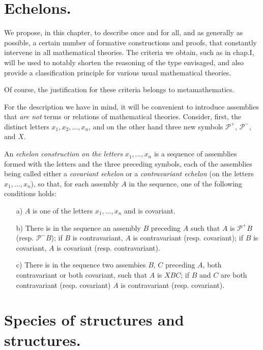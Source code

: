 \documentclass{article}
\newcommand{\Pp}{\mathcal{P}^+}
\newcommand{\Pm}{\mathcal{P}^-}
\begin{document}
\section*{Echelons.}

We propose, in this chapter, to describe once and for all, and as
generally as possible, a certain number of formative constructions and
proofs, that constantly intervene in all mathematical theories.  The
criteria we obtain, such as in chap.I, will be used to notably shorten
the reasoning of the type envisaged, and also provide a classification
principle for various usual mathematical theories.

Of course, the justification for these criteria belongs to
metamathematics.

For the description we have in mind, it will be convenient to
introduce assemblies that \emph{are not} terms or relations of
mathematical theories.  Consider, first, the distinct letters $x_1,
x_2, \dots, x_n$, and on the other hand three new symbols $\Pp$, $\Pm$,
and $X$.

An \emph{echelon construction on the letters} $x_1, \dots, x_n$ is a
sequence of assemblies formed with the letters and the three preceding
symbols, each of the assemblies being called either a \emph{covariant
  echelon} or a \emph{contravariant echelon} (on the letters $x_1,
\dots, x_n$), so that, for each assembly $A$ in the sequence, one of
the following conditions holds:
\begin{enumerate}
\item[a)] $A$ is one of the letters $x_1, \dots, x_n$ and is covariant.
\item[b)] There is in the sequence an assembly $B$ preceding $A$ such
  that $A$ is $\Pp B$ (resp. $\Pm B$); if $B$ is contravariant,
  $A$ is contravariant (resp. covariant); if $B$ is covariant, $A$
  is covariant (resp. contravariant).
\item[c)] There is in the sequence two assembies $B$, $C$ preceding
  $A$, both contravariant or both covariant, such that $A$ is $XBC$;
  if $B$ and $C$ are both contravariant (resp. covariant) $A$ is
  contravariant (resp. covariant).
\end{enumerate}

\section*{Species of structures and structures.}
\end{document}
